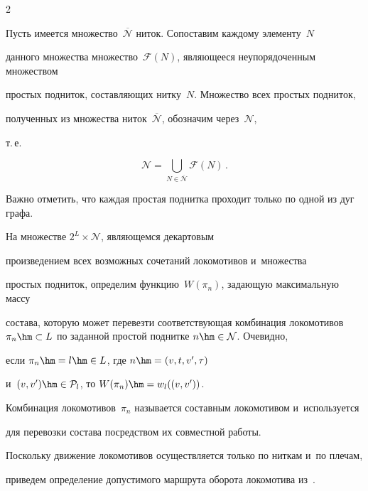 \begin{multicols}{2}
\smallskip





Пусть имеется множество~$\overline{\mathcal N}$ ниток. Сопоставим каждому элементу~$N$ 


данного множества множество~$\mathcal F(N)$,  являющееся неупорядоченным множеством 


простых подниток, составляющих нитку~$N$. Множество всех простых подниток, 


полученных из множества ниток~$\overline {\mathcal N}$, обозначим через~$\mathcal N$, 


т.\,е.\


\begin{equation*}




        \mathcal N = \bigcup_{N\in \overline{\mathcal N}} \mathcal F(N)\,.


\end{equation*}





Важно отметить, что каждая простая поднитка проходит только по одной из дуг графа.


    


На множестве $2^L\times \mathcal N$, являющемся декартовым 


произведением всех возможных сочетаний локомотивов и~множества 


простых подниток, определим функцию~$W(\pi_n)$, задающую максимальную массу 


состава, которую может перевезти со\-от\-вет\-ст\-ву\-ющая комбинация локомотивов $\pi_n 


\hm\subset L$ по заданной простой поднитке $n \hm\in \mathcal N$. Очевидно, 


если $\pi_n\hm = l \hm\in L$, где $n \hm= (v,t,v',\tau)$ 


и~$(v,v')\hm\in \mathcal P_l$, то $W(\pi_n) \hm= w_l((v, v'))$. 


Комбинация локомотивов~$\pi_n$ называется составным локомотивом и~используется 


для перевозки состава посредством их совместной работы.


    


Поскольку движение локомотивов осуществляется только по ниткам и~по плечам, 


приведем определение допустимого маршрута оборота локомотива из~\cite{AzanovBuyanov}.



\end{multicols}
